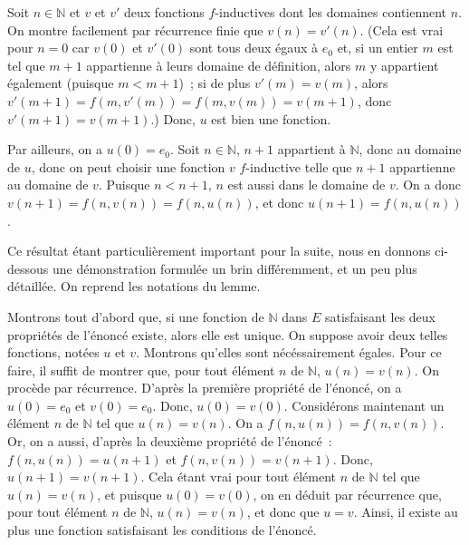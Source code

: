    Soit $n \in \mathbb{N}$ et $v$ et $v'$ deux fonctions $f$-inductives dont les domaines contiennent $n$. 
   On montre facilement par récurrence finie que $v(n) = v'(n)$. 
   (Cela est vrai pour $n=0$ car $v(0)$ et $v'(0)$ sont tous deux égaux à $e_0$ et, si un entier $m$ est tel que $m+1$ appartienne à leurs domaine de définition, alors $m$ y appartient également (puisque $m < m+1$) ; si de plus $v'(m) = v(m)$, alors $v'(m+1) = f(m,v'(m)) = f(m,v(m)) = v(m+1)$, donc $v'(m+1) = v(m+1)$.)
   Donc, $u$ est bien une fonction.

   Par ailleurs, on a $u(0) = e_0$. 
   Soit $n \in \mathbb{N}$, $n+1$ appartient à $\mathbb{N}$, donc au domaine de $u$, donc on peut choisir une fonction $v$ $f$-inductive telle que $n+1$ appartienne au domaine de $v$. 
   Puisque $n < n+1$, $n$ est aussi dans le domaine de $v$. 
   On a donc $v(n+1) = f(n, v(n)) = f(n,u(n))$, et donc $u(n+1) = f(n, u(n))$.

  \done 

\medskip 

Ce résultat étant particulièrement important pour la suite, nous en donnons ci-dessous une démonstration formulée un brin différemment, et un peu plus détaillée. 
On reprend les notations du lemme. 

Montrons tout d'abord que, si une fonction de $\mathbb{N}$ dans $E$ satisfaisant les deux propriétés de l'énoncé existe, alors elle est unique. 
On suppose avoir deux telles fonctions, notées $u$ et $v$. 
Montrons qu'elles sont nécéssairement égales. 
Pour ce faire, il suffit de montrer que, pour tout élément $n$ de $\mathbb{N}$, $u(n) = v(n)$. 
On procède par récurrence. 
D'après la première propriété de l'énoncé, on a $u(0) = e_0$ et $v(0) = e_0$. 
Donc, $u(0) = v(0)$. 
Considérons maintenant un élément $n$ de $\mathbb{N}$ tel que $u(n) = v(n)$. 
On a $f(n, u(n)) = f(n, v(n))$. 
Or, on a aussi, d'après la deuxième propriété de l'énoncé : $f(n, u(n)) = u(n+1)$ et $f(n, v(n)) = v(n+1)$. 
Donc, $u(n+1) = v(n+1)$. 
Cela étant vrai pour tout élément $n$ de $\mathbb{N}$ tel que $u(n) = v(n)$, et puisque $u(0) = v(0)$, on en déduit par récurrence que, pour tout élément $n$ de $\mathbb{N}$, $u(n) = v(n)$, et donc que $u = v$. 
Ainsi, il existe au plus une fonction satisfaisant les conditions de l'énoncé.

